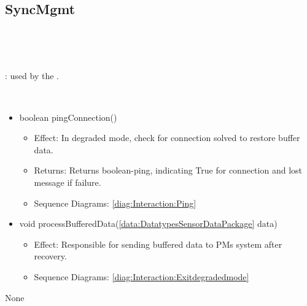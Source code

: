   \subsection{SyncMgmt}\label{int:InterfacesSyncMgmt}
    \begin{description}
      \item[Provided by:] \iconcomponent{}~
      \item[Required by:] \iconcomponent{}~ 
           \item[Description]: used by the .
      \item[Operations:] ~
    \begin{itemize}[noitemsep,nolistsep,leftmargin=-.25cm]
      \item \textsf{boolean pingConnection()}
        \begin{itemize}[noitemsep,nolistsep]
           \item Effect: In degraded mode, check for connection solved to restore buffer data. 
           \item Returns: Returns boolean-ping, indicating True for connection and lost message if failure.
           \item Sequence Diagrams: \cref{diag:Interaction:Ping}
        \end{itemize}
      \item \textsf{void processBufferedData(\ref{data:DatatypesSensorDataPackage} data)}
        \begin{itemize}[noitemsep,nolistsep]
           \item Effect:   Responsible for sending buffered data to PMs system after recovery. 
           \item Sequence Diagrams: \cref{diag:Interaction:Exitdegradedmode}
        \end{itemize}
    \end{itemize}
      \item[Diagrams:] None
    \end{description}

